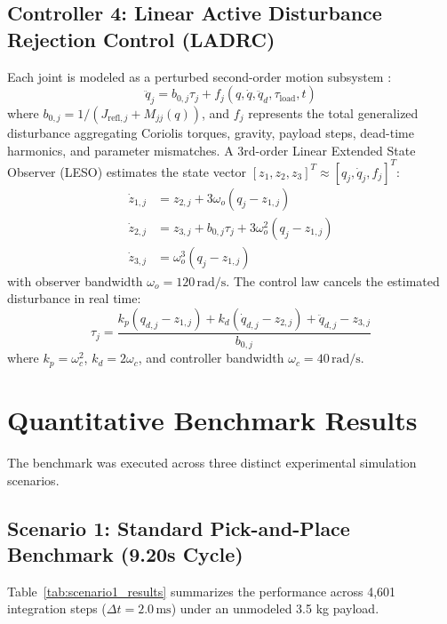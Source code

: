 \documentclass[journal,10pt,twocolumn]{IEEEtran}
\begin{document}
\subsection{Controller 4: Linear Active Disturbance Rejection Control (LADRC)}
Each joint is modeled as a perturbed second-order motion subsystem \cite{gao2003scaling}:
\begin{equation}
    \ddot{q}_j = b_{0, j} \tau_j + f_j(q, \dot{q}, \ddot{q}_d, \tau_{\text{load}}, t)
\end{equation}
where $b_{0, j} = 1 / (J_{\text{refl}, j} + M_{jj}(q))$, and $f_j$ represents the total generalized disturbance aggregating Coriolis torques, gravity, payload steps, dead-time harmonics, and parameter mismatches. A 3rd-order Linear Extended State Observer (LESO) estimates the state vector $[z_1, z_2, z_3]^T \approx [q_j, \dot{q}_j, f_j]^T$:
\begin{align}
    \dot{z}_{1, j} &= z_{2, j} + 3\omega_o (q_j - z_{1, j}) \\
    \dot{z}_{2, j} &= z_{3, j} + b_{0, j} \tau_j + 3\omega_o^2 (q_j - z_{1, j}) \\
    \dot{z}_{3, j} &= \omega_o^3 (q_j - z_{1, j})
\end{align}
with observer bandwidth $\omega_o = 120\,\text{rad/s}$. The control law cancels the estimated disturbance in real time:
\begin{equation}
    \tau_j = \frac{k_p (q_{d, j} - z_{1, j}) + k_d (\dot{q}_{d, j} - z_{2, j}) + \ddot{q}_{d, j} - z_{3, j}}{b_{0, j}}
\end{equation}
where $k_p = \omega_c^2$, $k_d = 2\omega_c$, and controller bandwidth $\omega_c = 40\,\text{rad/s}$.

\section{Quantitative Benchmark Results}

The benchmark was executed across three distinct experimental simulation scenarios.

\subsection{Scenario 1: Standard Pick-and-Place Benchmark (9.20s Cycle)}
Table~\ref{tab:scenario1_results} summarizes the performance across 4,601 integration steps ($\Delta t = 2.0\,\text{ms}$) under an unmodeled 3.5 kg payload.
\end{document}
